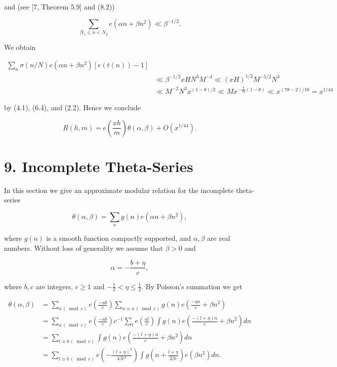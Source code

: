\documentclass[10pt]{article}
\begin{document}
and (see [7, Theorem 5.9] and (8.2))

$$
\sum_{N_{1} \leqslant n<N_{2}} e\left(\alpha n+\beta n^{2}\right) \ll \beta^{-1 / 2} .
$$

We obtain

$$
\begin{aligned}
\sum_{n} \sigma(n / N) e\left(\alpha n+\beta n^{2}\right)[e(t(n))-1] & \\
& \ll \beta^{-1/2}xHN^{3}M^{-4}\ll(xH)^{1/2} M^{-5 / 2} N^{3} \\
& \ll M^{-2} N^{3} x^{(1-\theta) / 2} \ll M x^{-\frac{7}{10}(1-\theta)} \ll x^{(7 \theta-2) / 10}=x^{1 / 44}
\end{aligned}
$$

by (4.1), (6.4), and (2.2). Hence we conclude


\begin{equation*}
R(h, m)=e\left(\frac{x h}{m}\right) \theta(\alpha, \beta)+O\left(x^{1 / 44}\right) . \tag{8.4}
\end{equation*}


\section*{9. Incomplete Theta-Series}
In this section we give an approximate modular relation for the incomplete theta-series


\begin{equation*}
\theta(\alpha, \beta)=\sum_{n} g(n) e\left(\alpha n+\beta n^{2}\right), \tag{9.1}
\end{equation*}


where $g(n)$ is a smooth function compactly supported, and $\alpha, \beta$ are real numbers. Without loss of generality we assume that $\beta>0$ and


\begin{equation*}
\alpha=-\frac{b+\eta}{c}, \tag{9.2}
\end{equation*}


where $b, c$ are integers, $c \geqslant 1$ and $-\frac{1}{2}<\eta \leqslant \frac{1}{2}$. By Poisson's summation we get

$$
\begin{aligned}
\theta(\alpha, \beta) & =\sum_{a\, (\bmod c)} e\left(\frac{-a b}{c}\right) \sum_{n\equiv a\, (\bmod c)} g(n) e\left(\frac{-\eta n}{c}+\beta n^{2}\right) \\
& =\sum_{a\, (\bmod c)} e\left(\frac{-a b}{c}\right) c^{-1} \sum_{l} e\left(\frac{a l}{c}\right) \int g(n) e\left(\frac{-(l+\eta) n}{c}+\beta n^{2}\right) d n \\
& =\sum_{l\equiv b\, (\bmod c)}\int g(n) e\left(\frac{-(l+\eta) n}{c}+\beta n^{2}\right) d n \\
& =\sum_{l \equiv b\, (\bmod c)} e\left(-\frac{(l+\eta)^{2}}{4 \beta c^{2}}\right) \int g\left(n+\frac{l+\eta}{2 \beta c}\right) e\left(\beta n^{2}\right) d n .
\end{aligned}
$$
\end{document}
